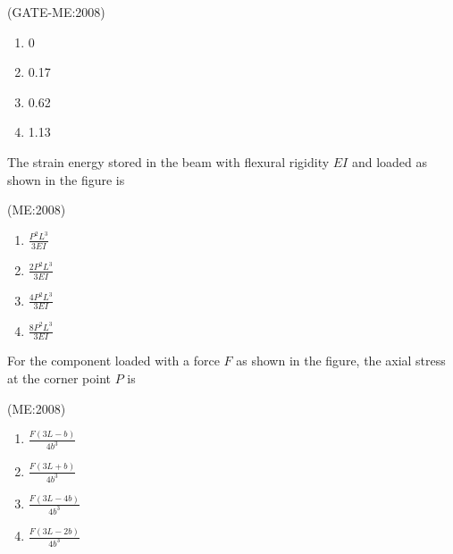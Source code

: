 	     \hfill{(GATE-ME:2008)}

    \begin{multicols}{4}
        \begin{enumerate}
            \item 0
            \item 0.17
            \item 0.62
            \item 1.13
        \end{enumerate}
    \end{multicols}

    \item The strain energy stored in the beam with flexural rigidity $EI$ and loaded as shown in the figure is
	    \begin{center}
	    
	    \end{center}
 
 \hfill{(ME:2008)}
 \begin{multicols}{2}
	 \begin{enumerate}
	    \item $\frac{P^2 L^3}{3EI}$
            \item $\frac{2P^2 L^3}{3EI}$
            \item $\frac{4P^2 L^3}{3EI}$
            \item $\frac{8P^2 L^3}{3EI}$
	    
        \end{enumerate}
    \end{multicols}

    \item For the component loaded with a force $F$ as shown in the figure, the axial stress at the corner point $P$ is
	    \begin{center}
	    
	    \end{center}

	     \hfill{(ME:2008)}

       \begin{multicols}{4}
        \begin{enumerate}
            \item $\frac{F(3L-b)}{4b^3}$
            \item $\frac{F(3L+b)}{4b^3}$
            \item $\frac{F(3L-4b)}{4b^3}$
            \item $\frac{F(3L-2b)}{4b^3}$
        \end{enumerate}
    \end{multicols}

